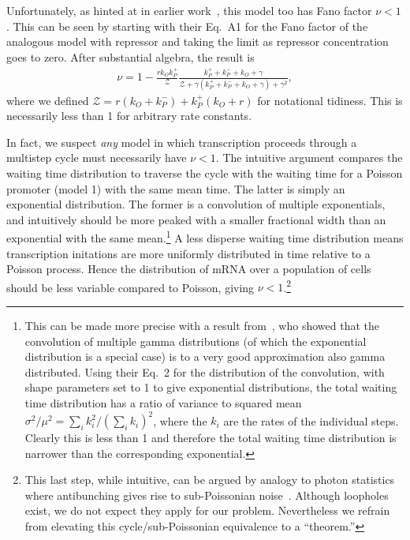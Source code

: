 Unfortunately, as hinted at in earlier work~\cite{Mitarai2015}, this model too has
Fano factor $\nu<1$. This can be seen by starting with their Eq.~A1 for the Fano
factor of the analogous model with repressor and taking the limit as repressor
concentration goes to zero. After substantial algebra, the result is
\begin{align}
\nu = 1 - \frac{r k_O k_P^+}{\mathcal{Z}}
\frac{k_P^+ + k_P^- + k_O + \gamma}
        {\mathcal{Z} + \gamma(k_P^+ + k_P^- + k_O + \gamma) + \gamma^2},
\end{align}
where we defined $\mathcal{Z} = r(k_O + k_P^-) + k_P^+(k_O + r)$ for notational
tidiness. This is necessarily less than 1 for arbitrary rate constants.

In fact, we suspect \textit{any} model in which transcription proceeds through a
multistep cycle must necessarily have $\nu<1$. The intuitive argument compares
the waiting time distribution to traverse the cycle with the waiting time for a
Poisson promoter (model 1) with the same mean time. The latter is simply an
exponential distribution. The former is a convolution of multiple exponentials,
and intuitively should be more peaked with a smaller fractional width than an
exponential with the same mean.\footnote{This can be made more precise with a
result from~\cite{Stewart2007}, who showed that the convolution of multiple
gamma distributions (of which the exponential distribution is a special case) is
to a very good approximation also gamma distributed. Using their Eq.~2 for the
distribution of the convolution, with shape parameters set to 1 to give
exponential distributions, the total waiting time distribution has a ratio of
variance to squared mean $\sigma^2/\mu^2 = \sum_i k_i^2/\left(\sum_i
k_i\right)^2$, where the $k_i$ are the rates of the individual steps. Clearly
this is less than 1 and therefore the total waiting time distribution is
narrower than the corresponding exponential.} A less disperse waiting time
distribution means transcription initations are more uniformly distributed in
time relative to a Poisson process. Hence the distribution of mRNA over a
population of cells should be less variable compared to Poisson, giving
$\nu<1$.\footnote{This last step, while intuitive, can be argued by analogy to
photon statistics where antibunching gives rise to sub-Poissonian
noise~\cite{Paul1982, Zou1990}. Although loopholes exist, we do not expect they
apply for our problem. Nevertheless we refrain from elevating this
cycle/sub-Poissonian equivalence to a ``theorem.'' }

